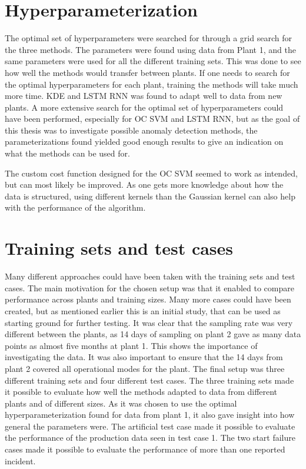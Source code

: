 \section{Hyperparameterization}
    The optimal set of hyperparameters were searched for through a grid search for the three methods. The parameters were found using data from Plant 1, and the same parameters were used for all the different training sets. This was done to see how well the methods would transfer between plants. If one needs to search for the optimal hyperparameters for each plant, training the methods will take much more time. KDE and LSTM RNN was found to adapt well to data from new plants. A more extensive search for the optimal set of hyperparameters could have been performed, especially for OC SVM and LSTM RNN, but as the goal of this thesis was to investigate possible anomaly detection methods, the parameterizations found yielded good enough results to give an indication on what the methods can be used for.
    
    The custom cost function designed for the OC SVM seemed to work as intended, but can most likely be improved. As one gets more knowledge about how the data is structured, using different kernels than the Gaussian kernel can also help with the performance of the algorithm.

\section{Training sets and test cases}
    Many different approaches could have been taken with the training sets and test cases. The main motivation for the chosen setup was that it enabled to compare performance across plants and training sizes. Many more cases could have been created, but as mentioned earlier this is an initial study, that can be used as starting ground for further testing. It was clear that the sampling rate was very different between the plants, as 14 days of sampling on plant 2 gave as many data points as almost five months at plant 1. This shows the importance of investigating the data. It was also important to ensure that the 14 days from plant 2 covered all operational modes for the plant. The final setup was three different training sets and four different test cases. The three training sets made it possible to evaluate how well the methods adapted to data from different plants and of different sizes. As it was chosen to use the optimal hyperparameterization found for data from plant 1, it also gave insight into how general the parameters were. The artificial test case made it possible to evaluate the performance of the production data seen in test case 1. The two start failure cases made it possible to evaluate the performance of more than one reported incident. 


